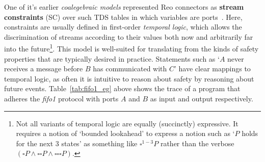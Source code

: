 One of it's earlier \textit{coalegebraic models} represented Reo connectors as \textbf{stream constraints} (SC) over such TDS tables in which variables are ports~\cite{arbab2004reo}. Here, constraints are usually defined in first-order \textit{temporal logic}, which allows the discrimination of streams according to their values both now and arbitrarily far into the future\footnote{Not all variants of temporal logic are equally (succinctly) expressive. It requires a notion of `bounded lookahead' to express a notion such as `$P$ holds for the next 3 states' as something like $\square ^{1-3} P$ rather than the verbose $(\square P \wedge \square \square P \wedge \square \square \square P)$.}. This model is well-suited for translating from the kinds of safety properties that are typically desired in practice. Statements such as `$A$ never receives a message before $B$ has communicated with $C$' have clear mappings to temporal logic, as often it is intuitive to reason about safety by reasoning about future events. Table~\ref{tab:fifo1_eg} above shows the trace of a program that adheres the \textit{fifo1} protocol with ports $A$ and $B$ as input and output respectively.

